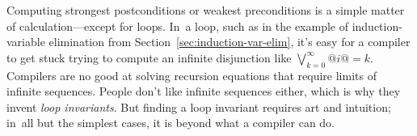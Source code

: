 \documentclass[blockstyle,preprint,natbib,nocopyrightspace]{sigplanconf}
\newcommand\secref[1]{Section~\ref{sec:#1}}
\begin{document}
Computing strongest postconditions or weakest
preconditions is a simple matter of calculation---except for loops.
In~a loop, such as in the example of induction-variable elimination from
\secref{induction-var-elim}, 
it's easy for a compiler to get stuck trying to compute an
infinite disjunction like $\bigvee_{k=0}^{\infty} @i@=k$.
Compilers are no good at solving recursion
equations that require limits of infinite sequences.
%
People don't like infinite sequences either, which is why they invent
\emph{loop invariants}. 
But finding a loop invariant requires art and intuition;
in~all but the simplest cases, it is beyond
what a compiler can do.


\end{document}
